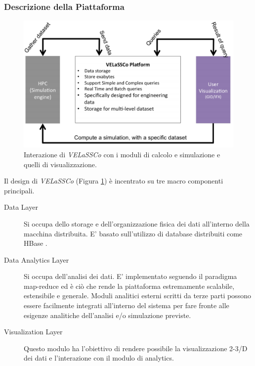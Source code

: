 \documentclass[a4paper,11pt]{paper}
\begin{document}
\subsubsection{Descrizione della Piattaforma}
\begin{figure}[h!]
 \centering
   \includegraphics[width=\textwidth]{images/vel}
 \caption{Interazione di \textit{VELaSSCo} con i moduli di calcolo e simulazione e quelli di visualizzazione.}
       \label{fig:vel}
 \end{figure}
Il design di \textit{VELaSSCo} (Figura \ref{fig:vel}) è incentrato su tre macro componenti principali.
\begin{description}
\item [Data Layer] Si occupa dello storage e dell'organizzazione fisica dei dati all'interno della macchina distribuita. E' basato sull'utilizzo di database distribuiti come HBase .
\item [Data Analytics Layer] Si occupa dell'analisi dei dati. E' implementato seguendo il paradigma map-reduce  ed è ciò che rende la piattaforma estremamente scalabile, estensibile e generale. Moduli analitici esterni scritti da terze parti possono essere facilmente integrati all'interno del sistema per fare fronte alle esigenze analitiche dell'analisi e/o simulazione previste.
\item [Visualization Layer] 
Questo modulo ha l'obiettivo di rendere possibile la visualizzazione 2-3/D dei dati e l'interazione con il modulo di analytics.
\end{description}
\end{document}
